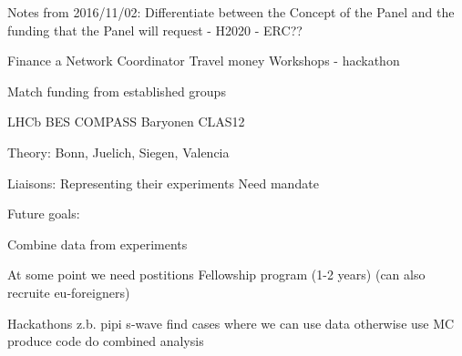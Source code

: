 




Notes from 2016/11/02:
Differentiate between the Concept of the Panel
and
the funding that the Panel will request
- H2020
- ERC??

Finance a Network Coordinator
Travel money
Workshops - hackathon

Match funding from established groups

LHCb
BES
COMPASS
Baryonen CLAS12

Theory: Bonn, Juelich, Siegen, Valencia 



Liaisons:
Representing their experiments
Need mandate


Future goals:

Combine data from experiments

At some point we need postitions
Fellowship program (1-2 years) (can also recruite eu-foreigners)

Hackathons
z.b. pipi s-wave
find cases where we can use data
otherwise use MC
produce code
do combined analysis


